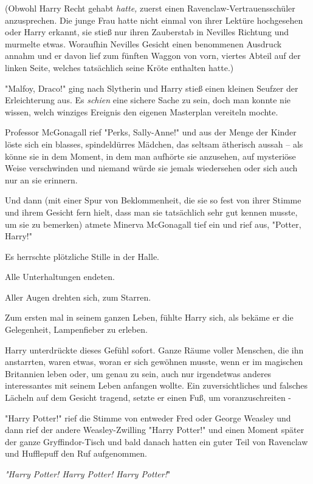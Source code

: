 {(Obwohl Harry Recht gehabt \emph{hatte,} zuerst einen Ravenclaw-Vertrauensschüler anzusprechen. Die junge Frau hatte nicht einmal von ihrer Lektüre hochgesehen oder Harry erkannt, sie stieß nur ihren Zauberstab in Nevilles Richtung und murmelte etwas. Woraufhin Nevilles Gesicht einen benommenen Ausdruck annahm und er davon lief zum fünften Waggon von vorn, viertes Abteil auf der linken Seite, welches tatsächlich seine Kröte enthalten hatte.)

"Malfoy, Draco!" ging nach Slytherin und Harry stieß einen kleinen Seufzer der Erleichterung aus. Es \emph{schien} eine sichere Sache zu sein, doch man konnte nie wissen, welch winziges Ereignis den eigenen Masterplan vereiteln mochte.

Professor McGonagall rief "Perks, Sally-Anne!" und aus der Menge der Kinder löste sich ein blasses, spindeldürres Mädchen, das seltsam ätherisch aussah -- als könne sie in dem Moment, in dem man aufhörte sie anzusehen, auf mysteriöse Weise verschwinden und niemand würde sie jemals wiedersehen oder sich auch nur an sie erinnern.

Und dann (mit einer Spur von Beklommenheit, die sie so fest von ihrer Stimme und ihrem Gesicht fern hielt, dass man sie tatsächlich sehr gut kennen musste, um sie zu bemerken) atmete Minerva McGonagall tief ein und rief aus, "Potter, Harry!"

Es herrschte plötzliche Stille in der Halle.

Alle Unterhaltungen endeten.

Aller Augen drehten sich, zum Starren.

Zum ersten mal in seinem ganzen Leben, fühlte Harry sich, als bekäme er die Gelegenheit, Lampenfieber zu erleben.

Harry unterdrückte dieses Gefühl sofort. Ganze Räume voller Menschen, die ihn anstarrten, waren etwas, woran er sich gewöhnen musste, wenn er im magischen Britannien leben oder, um genau zu sein, auch nur irgendetwas anderes interessantes mit seinem Leben anfangen wollte. Ein zuversichtliches und falsches Lächeln auf dem Gesicht tragend, setzte er einen Fuß, um voranzuschreiten -

"Harry Potter!" rief die Stimme von entweder Fred oder George Weasley und dann rief der andere Weasley-Zwilling "Harry Potter!" und einen Moment später der ganze Gryffindor-Tisch und bald danach hatten ein guter Teil von Ravenclaw und Hufflepuff den Ruf aufgenommen.

\emph{"Harry Potter! Harry Potter! Harry Potter!}"

}

